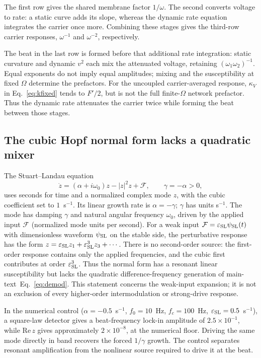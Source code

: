 The first row gives the shared membrane factor $1/\omega$. The second converts
voltage to rate: a static curve adds its slope, whereas the dynamic rate equation
integrates the carrier once more. Combining these stages gives the third-row
carrier responses, $\omega^{-1}$ and $\omega^{-2}$, respectively.

The beat in the last row is formed before that additional rate integration:
static curvature and dynamic $v^2$ each mix the attenuated voltage, retaining
$(\omega_1\omega_2)^{-1}$. Equal exponents do not imply equal amplitudes; mixing
and the susceptibility at fixed $\Omega$ determine the prefactors. For the
uncoupled carrier-averaged response, $\kappa_V$ in Eq.~\eqref{eq:kfixed} tends to
$F'/2$, but is not the full finite-$\Omega$ network prefactor. Thus the dynamic
rate attenuates the carrier twice while forming the beat between those stages.

\ifjne

\fi

\subsection{The cubic Hopf normal form lacks a quadratic mixer}\label{app:sl}
The Stuart--Landau equation \cite{pikovsky2001}
\begin{equation}
\dot z=(\alpha+i\omega_0)z-|z|^2z+\mathcal F,\qquad
\gamma=-\alpha>0,
\label{eq:sl}
\end{equation}
uses seconds for time and a normalized complex mode $z$, with the cubic
coefficient set to $1$~s$^{-1}$. Its linear growth rate is $\alpha=-\gamma$;
$\gamma$ has units s$^{-1}$. The mode has damping $\gamma$ and natural angular frequency
$\omega_0$, driven by the applied input $\mathcal F$ (normalized mode units per second). For a weak input
$\mathcal F=\varepsilon_{\rm SL} \psi_{\rm SL}(t)$ with dimensionless waveform $\psi_{\rm SL}$ on the stable side, the perturbative response has
the form $z=\varepsilon_{\rm SL} z_1+\varepsilon_{\rm SL}^3z_3+\cdots$. There is no second-order
source: the first-order response contains only the applied frequencies, and the
cubic first contributes at order $\varepsilon_{\rm SL}^3$. Thus the normal form has a
resonant linear susceptibility but lacks the quadratic difference-frequency
generation of \ifsupp main-text\fi\ Eq.~\eqref{eq:demod}. This statement concerns the weak-input
expansion; it is not an exclusion of every higher-order intermodulation or
strong-drive response.

In the numerical control ($\alpha=-0.5$~s$^{-1}$, $f_0=10$~Hz, $f_c=100$~Hz,
$\varepsilon_{\rm SL}=0.5$~s$^{-1}$), a square-law detector gives a beat-frequency lock-in amplitude
of $2.5\times10^{-1}$, while $\mathrm{Re}\,z$ gives approximately
$2\times10^{-8}$, at the numerical floor. Driving the same mode directly in band
recovers the forced $1/\gamma$ growth. The control separates resonant amplification
from the nonlinear source required to drive it at the beat.
